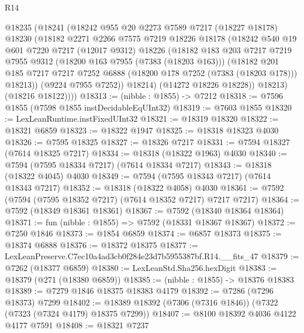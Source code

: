 \begin{lexlean}{R14}
\begin{coremodule}
        @18235
          (@18241
            (@18242
              @955
              @20
              @2273
              @7589
              @7217
              (@18227 @18178)
              @18230
              (@18182
                @2271
                @2266
                @7575
                @7219
                @18226
                @18178
                (@18242
                  @540
                  @19
                  @601
                  @7220
                  @7217
                  (@12017 @9312)
                  @18226
                  (@18182
                    @183
                    @203
                    @7217
                    @7219
                    @7955
                    @9312
                    (@18200 @163 @7955 (@7383 (@18203 @163)))
                    (@18182
                      @201
                      @185
                      @7217
                      @7217
                      @7252
                      @6888
                      (@18200 @178 @7252 (@7383 (@18203 @178)))
                      @18213))
                  (@9224 @7955 @7252))
                @18214)
              (@14272 @18226 @18228))
            @18213)
          (@18216 @18122))))
@18313 := (nibble : @1855) -> @7212
@18318 := @7596 @1855 (@7598 @1855 instDecidableEqUInt32)
@18319 := @7603 @1855
@18320 := LexLeanRuntime.instFixedUInt32
@18321 := @18319 @18320
@18322 := @18321 @6859
@18323 := @18322 @1947
@18325 := @18318 @18323 @4030
@18326 := @7595 @18325
@18327 := @18326 @7217
@18331 := @7594 @18327 (@7614 @18325 @7217)
@18334 := @18318 (@18322 @1963) @4030
@18340 := @7594 (@7595 @18334 @7217) (@7614 @18334 @7217)
@18343 := @18318 (@18322 @4045) @4030
@18349 := @7594 (@7595 @18343 @7217) (@7614 @18343 @7217)
@18352 := @18318 (@18322 @4058) @4030
@18361 := @7592 (@7594 (@7595 @18352 @7217) (@7614 @18352 @7217) @7217 @7217)
@18364 := @7592 (@18349 @18361 @18361)
@18367 := @7592 (@18340 @18364 @18364)
@18371 := fun (nibble : @1855) => @7592 (@18331 @18367 @18367)
@18372 := @7250 @1846
@18373 := @1854 @6859
@18374 := @6857 @18373
@18375 := @18374 @6888
@18376 := @18372 @18375
@18377 := LexLeanPreserve.C7ec10a4ad3cb0f284e23d7b5955387bf.R14.__fits_47
@18379 := @7262 (@18377 @6859)
@18380 := LexLeanStd.Sha256.hexDigit
@18383 := @18379 (@271 (@18380 @6859))
@18385 := (nibble : @1855) -> @18376 @18383
@18389 := @7279 @1846 @18375 @18383 @4179
@18392 := @7286 (@7296 @18373) @7299
@18402 := @18389 @18392 (@7306 (@7316 @1846)) (@7322 (@7323 (@7324 @4179) @18375 @7299))
@18407 := @8100 @18392 @4036 @4122 @4177 @7591
@18408 := @18321 @7237

\end{coremodule}
\end{lexlean}
